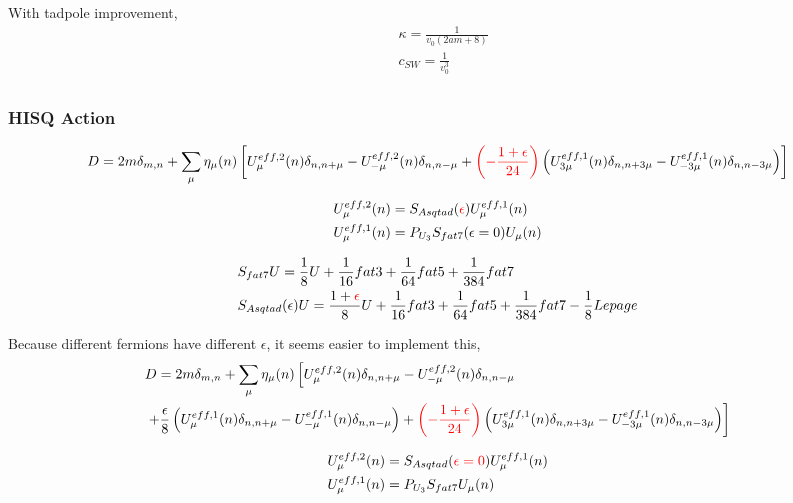 With tadpole improvement,
\begin{equation}
\begin{split}
&\kappa = \frac{1}{v_0(2am + 8)}\\
&c_{SW}=\frac{1}{v_0^3}\\
\end{split}
\end{equation}

\subsubsection{\label{HISQAction}HISQ Action}

\begin{equation}
\begin{split}
&D=2m\delta _{m,n} + \sum _{\mu}\eta _{\mu}(n)\left[U^{eff,2}_{\mu}(n) \delta _{n,n+\mu} - U^{eff,2}_{-\mu}(n)\delta _{n,n-\mu}+ \textcolor[rgb]{1,0,0}{\left(-\frac{1+\epsilon}{24}\right)}\left(U^{eff,1}_{3\mu}(n) \delta _{n,n+3\mu} - U^{eff,1}_{-3\mu}(n)\delta _{n,n-3\mu}\right)\right]\\
\end{split}
\end{equation}

\begin{equation}
\begin{split}
&U^{eff,2}_{\mu}(n) = S_{Asqtad}(\textcolor[rgb]{1,0,0}{\epsilon})U^{eff,1}_{\mu}(n)\\
&U^{eff,1}_{\mu}(n) = P_{U_3}S_{fat7}(\epsilon=0)U_{\mu}(n)\\
\end{split}
\end{equation}

\begin{equation}
\begin{split}
&S_{fat7}U = \frac{1}{8}U+\frac{1}{16}fat3+\frac{1}{64}fat5+\frac{1}{384}fat7\\
&S_{Asqtad}(\epsilon)U = \frac{1+\textcolor[rgb]{1,0,0}{\epsilon}}{8}U+\frac{1}{16}fat3+\frac{1}{64}fat5+\frac{1}{384}fat7-\frac{1}{8}Lepage\\
\end{split}
\end{equation}

Because different fermions have different $\epsilon$, it seems easier to implement this,
\begin{equation}
\begin{split}
&D=2m\delta _{m,n} + \sum _{\mu}\eta _{\mu}(n)\left[U^{eff,2}_{\mu}(n) \delta _{n,n+\mu} - U^{eff,2}_{-\mu}(n)\delta _{n,n-\mu}\right.\\
&\left.+\frac{\epsilon}{8}\left(U^{eff,1}_{\mu}(n) \delta _{n,n+\mu} - U^{eff,1}_{-\mu}(n)\delta _{n,n-\mu}\right)+ \textcolor[rgb]{1,0,0}{\left(-\frac{1+\epsilon}{24}\right)}\left(U^{eff,1}_{3\mu}(n) \delta _{n,n+3\mu} - U^{eff,1}_{-3\mu}(n)\delta _{n,n-3\mu}\right)\right]\\
\end{split}
\end{equation}

\begin{equation}
\begin{split}
&U^{eff,2}_{\mu}(n) = S_{Asqtad}(\textcolor[rgb]{1,0,0}{\epsilon=0})U^{eff,1}_{\mu}(n)\\
&U^{eff,1}_{\mu}(n) = P_{U_3}S_{fat7}U_{\mu}(n)\\
\end{split}
\end{equation}